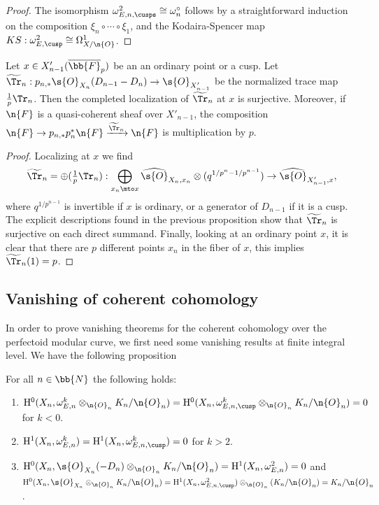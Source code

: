 \begin{proof}
The isomorphism $\omega_{E,n,\cusps}^2\cong \omega_n^\circ$ follows by a straightforward induction on the composition $\xi_n\circ \cdots \circ \xi_{1}$, and the Kodaira-Spencer map $KS: \omega_{E,\cusp}^2\cong \Omega^1_{X/\n{O}}$.
\end{proof}

\begin{lem}
\label{LemmaSurjTrace}
Let $x\in X'_{n-1}(\overline{\bb{F}}_p)$ be an an ordinary point or a cusp. Let $\widetilde{\Tr}_n: p_{n,*}\s{O}_{X_n}(D_{n-1}-D_n)\to \s{O}_{X'_{n-1}}$ be the normalized trace map $\frac{1}{p} \Tr_n$. Then the completed localization of $\widetilde{\Tr}_n$ at $x$ is surjective. Moreover, if $\n{F}$ is a quasi-coherent sheaf over $X'_{n-1}$, the composition $\n{F}\to p_{n,*}p_n^*\n{F}\xrightarrow{\widetilde{\Tr}_n} \n{F}$ is multiplication by $p$.
\end{lem}

\begin{proof}
Localizing at $x$ we find
\[
\widetilde{\Tr}_n= \oplus (\tfrac{1}{p}\Tr_n):\bigoplus_{x_n\mto x} \widehat{\s{O}}_{X_n, x_n}\otimes (q^{1/p^n-1/p^{n-1}}) \to \widehat{\s{O}}_{X'_{n-1}, x},
\]
where $q^{1/p^{n-1}}$ is invertible if $x$ is ordinary, or a generator of $D_{n-1}$ if it is a cusp. The explicit descriptions found in the previous proposition show that $\widetilde{\Tr}_n$ is surjective on each direct summand. Finally, looking at an ordinary point $x$, it is clear that there are $p$ different points $x_n$ in the fiber of $x$, this implies $\widetilde{\Tr}_n(1)=p$.
\end{proof}

\subsection*{Vanishing of coherent cohomology}

In order to prove vanishing theorems for the coherent cohomology over the perfectoid modular curve, we first need some vanishing results at finite integral level. We have the following proposition

\begin{prop}
\label{vanishingNeg}
For all $n\in \bb{N}$ the following holds:

\begin{enumerate}
\item\label{vanishingNeg1} $\mathrm{H}^0(X_n,\omega_{E,n}^k\otimes_{\n{O}_n} K_n/\n{O}_n)=\mathrm{H}^0(X_n, \omega^k_{E,n,\cusp}\otimes_{\n{O}_n} K_n/\n{O}_n)=0$ for $k<0$.

\item\label{vanishingNeg2} $\mathrm{H}^1(X_n,\omega_{E,n}^k)=\mathrm{H}^1(X_n, \omega^k_{E,n,\cusp})=0$ for $k>2$.

\item\label{vanishingNeg3} $\mathrm{H}^0(X_n, \s{O}_{X_n}(-D_n)\otimes_{\n{O}_n} K_n/\n{O}_n)=\mathrm{H}^1(X_n,\omega^2_{E,n})=0$ and $\mathrm{H}^0(X_n, \s{O}_{X_n}\otimes_{\n{O}_n} K_n/\n{O}_n)= \mathrm{H}^1(X_n, \omega^2_{E,n,\cusp})\otimes_{\n{O}_n} (K_n/\n{O}_n)= K_n/\n{O}_n$.
\end{enumerate}
\end{prop}

